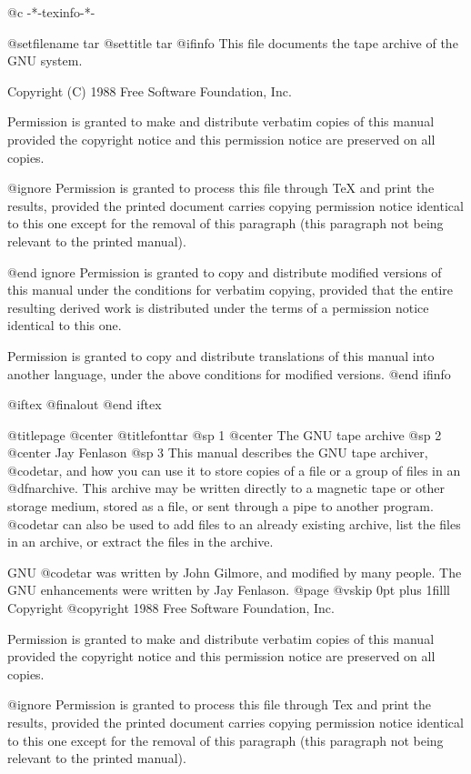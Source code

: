  @c -*-texinfo-*-

@setfilename tar
@settitle tar
@ifinfo
This file documents the tape archive of the GNU system.

Copyright (C) 1988 Free Software Foundation, Inc.

Permission is granted to make and distribute verbatim copies of this
manual provided the copyright notice and this permission notice are
preserved on all copies.

@ignore
Permission is granted to process this file through TeX and print the
results, provided the printed document carries copying permission
notice identical to this one except for the removal of this paragraph
(this paragraph not being relevant to the printed manual).

@end ignore
Permission is granted to copy and distribute modified versions of
this manual under the conditions for verbatim copying, provided that
the entire resulting derived work is distributed under the terms of
a permission notice identical to this one.

Permission is granted to copy and distribute translations of this
manual into another language, under the above conditions for
modified versions.
@end ifinfo

@iftex
@finalout
@end iftex

@titlepage
@center @titlefont{tar}
@sp 1
@center The GNU tape archive
@sp 2
@center Jay Fenlason
@sp 3
This manual describes the GNU tape archiver, @code{tar}, and how you
can use it to store copies of a file or a group of files in an
@dfn{archive}.  This archive may be written directly to a magnetic
tape or other storage medium, stored as a file, or sent through a
pipe to another program.  @code{tar} can also be used to add files
to an already existing archive, list the files in an archive, or
extract the files in the archive.

GNU @code{tar} was written by John Gilmore, and modified by many
people.  The GNU enhancements were written by Jay Fenlason.
@page
@vskip 0pt plus 1filll
Copyright @copyright{} 1988 Free Software Foundation, Inc.

Permission is granted to make and distribute verbatim copies of
this manual provided the copyright notice and this permission notice
are preserved on all copies.

@ignore
Permission is granted to process this file through Tex and print the
results, provided the printed document carries copying permission
notice identical to this one except for the removal of this paragraph
(this paragraph not being relevant to the printed manual).

